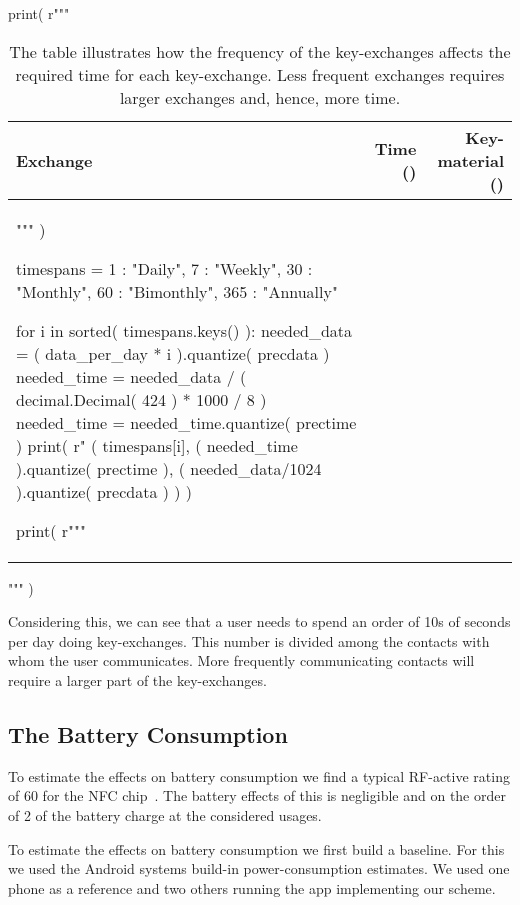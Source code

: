 \begin{table}
  \centering
  \caption{%
    The table illustrates how the frequency of the key-exchanges affects the 
    required time for each key-exchange.
    Less frequent exchanges requires larger exchanges and, hence, more time.
  }
  \label{tbl:MeetingsTradeoff}
  \begin{pycode}[random]
print( r"""
\begin{tabular}{lrr}
  Exchange &
  Time (\second) &
  Key-material (\kibi\byte) \\
  \toprule
""" )

timespans = {
  1 : "Daily",
  7 : "Weekly",
  30 : "Monthly",
  60 : "Bimonthly",
  365 : "Annually"
}

for i in sorted( timespans.keys() ):
  needed_data = ( data_per_day * i ).quantize( precdata )
  needed_time = needed_data / ( decimal.Decimal( 424 ) * 1000 / 8 )
  needed_time = needed_time.quantize( prectime )
  print( r"%
  ( timespans[i],
    ( needed_time ).quantize( prectime ),
    ( needed_data/1024 ).quantize( precdata )
    ) )

print( r"""
  \bottomrule
\end{tabular}
""" )
  \end{pycode}
\end{table}

Considering this, we can see that a user needs to spend an order of 10s of 
seconds per day doing key-exchanges.
This number is divided among the contacts with whom the user communicates.
More frequently communicating contacts will require a larger part of the 
key-exchanges.

\subsection{The Battery Consumption}
\label{sec:Battery}
To estimate the effects on battery consumption we find a typical RF-active 
rating of \unit{60}{\milli\ampere} for the NFC chip~\cite{NFCController}.
The battery effects of this is negligible and on the order of 
\unit{2}{\text{\textperthousand}} of the battery charge at the considered 
usages.

To estimate the effects on battery consumption we first build a baseline.
For this we used the Android systems build-in power-consumption estimates.
We used one phone as a reference and two others running the app implementing 
our scheme.

